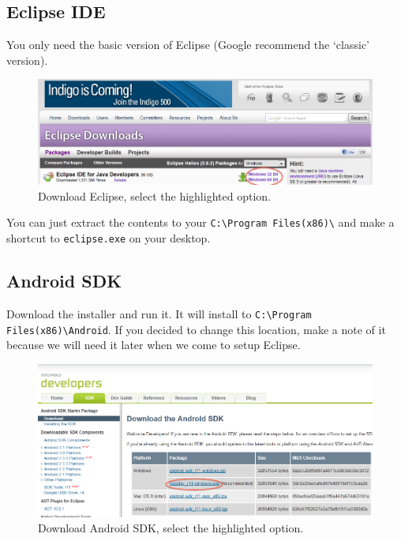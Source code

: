 \subsection{Eclipse IDE}

You only need the basic version of Eclipse (Google recommend the `classic' version).
\begin{figure}[!ht]
  \includegraphics[width=\textwidth]{./images/eclipse.png}%
  \caption{Download Eclipse, select the highlighted option.}%
  \label{fig:eclipseide}%
\end{figure}

You can just extract the contents to your \Verb|C:\Program Files(x86)\| and make a shortcut to \Verb|eclipse.exe| on your desktop.

\subsection{Android SDK}

Download the installer and run it. It will install \newline
to \Verb|C:\Program Files(x86)\Android|. If you decided to change this location, make a note of it because we will need it later when we come to setup Eclipse.

\begin{figure}[!ht]
  \includegraphics[width=\textwidth]{./images/android.png}%
  \caption{Download Android SDK, select the highlighted option.}%
  \label{fig:androidsdk}%
\end{figure}

